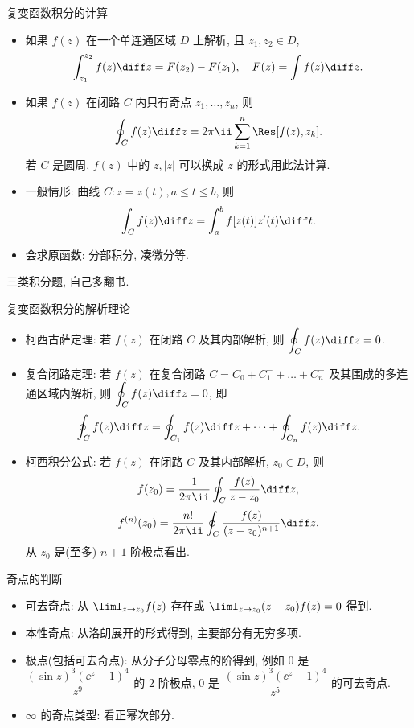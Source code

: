 \documentclass[aspectratio=169,handout]{ctexbeamer}
\begin{document}
\begin{frame}{复变函数积分的计算}
	\beqskip{3pt}
	\begin{itemize}
		\item 如果 $f(z)$ 在一个单连通区域 $D$ 上解析, 且 $z_1,z_2\in D$,
	\[
			\int_{z_1}^{z_2}f(z)\diff z=F(z_2)-F(z_1),\quad
			F(z)=\int f(z)\diff z.
	\]
		\item 如果 $f(z)$ 在闭路 $C$ 内只有奇点 $z_1,\dots,z_n$, 则
	\[
			\oint_C f(z)\diff z=2\pi\ii\sum_{k=1}^n\Res[f(z),z_k].
	\]
		若 $C$ 是圆周, $f(z)$ 中的 $z,|z|$ 可以换成 $z$ 的形式用此法计算.
		\item 一般情形: 曲线 $C:z=z(t),a\le t\le b$, 则
	\[
			\int_C f(z)\diff z=\int_a^b f[z(t)]z'(t)\diff t.
	\]
		\item 会求原函数: 分部积分, 凑微分等.
	\end{itemize}
	\onslide<+->
	\begin{exercise}
		三类积分题, 自己多翻书.
	\end{exercise}
	\endgroup
\end{frame}


\begin{frame}{复变函数积分的解析理论}
	\begin{itemize}
		\item 柯西古萨定理: 若 $f(z)$ 在闭路 $C$ 及其内部解析, 则 $\displaystyle\oint_Cf(z)\diff z=0$.
		\item 复合闭路定理: 若 $f(z)$ 在复合闭路 $C=C_0+C_1^-+\dots+C_n^-$ 及其围成的多连通区域内解析, 则 $\displaystyle\oint_Cf(z)\diff z=0$, 即
	\[
			\oint_Cf(z)\diff z=\oint_{C_1}f(z)\diff z+\cdots+\oint_{C_n}f(z)\diff z.
	\]
		\item 柯西积分公式: 若 $f(z)$ 在闭路 $C$ 及其内部解析, $z_0\in D$, 则
	\[
			f(z_0)=\frac{1}{2\pi\ii}\oint_C\frac{f(z)}{z-z_0}\diff z,
	\]
	\[
			f^{(n)}(z_0)=\frac{n!}{2\pi\ii}\oint_C\frac{f(z)}{(z-z_0)^{n+1}}\diff z.
	\]
		从 $z_0$ 是(至多) $n+1$ 阶极点看出.
	\end{itemize}
\end{frame}


\begin{frame}{奇点的判断}
	\begin{itemize}
		\item 可去奇点: 从 $\liml_{z\to z_0}f(z)$ 存在或 $\liml_{z\to z_0}(z-z_0)f(z)=0$ 得到.
		\item 本性奇点: 从洛朗展开的形式得到, 主要部分有无穷多项.
		\item 极点(包括可去奇点): 从分子分母零点的阶得到, 例如
		$0$ 是 $\dfrac{(\sin z)^3(\ee^z-1)^4}{z^9}$ 的 $2$ 阶极点,
		$0$ 是 $\dfrac{(\sin z)^3(\ee^z-1)^4}{z^5}$ 的可去奇点.
		\item $\infty$ 的奇点类型: 看正幂次部分.
	\end{itemize}
\end{frame}
\end{document}
